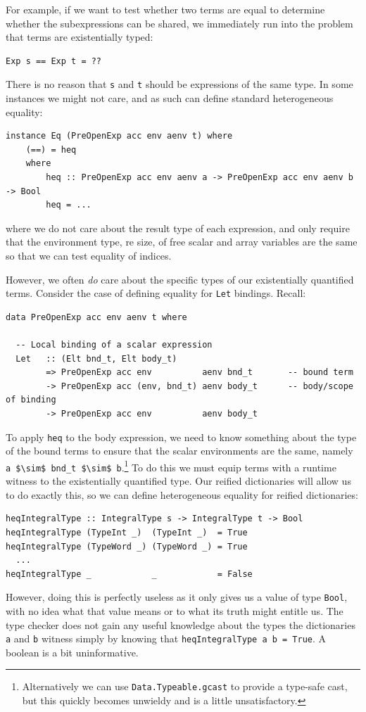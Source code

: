 For example, if we want to test whether two terms are equal to determine whether
the subexpressions can be shared, we immediately run into the problem that terms
are existentially typed:
%
\begin{lstlisting}[style=haskell]
Exp s == Exp t = ??
\end{lstlisting}
%
There is no reason that \texttt{s} and \texttt{t} should be expressions of the
same type. In some instances we might not care, and as such can define standard
heterogeneous equality:
%
\begin{lstlisting}[style=haskell]
instance Eq (PreOpenExp acc env aenv t) where
    (==) = heq
    where
        heq :: PreOpenExp acc env aenv a -> PreOpenExp acc env aenv b -> Bool
        heq = ...
\end{lstlisting}
%
where we do not care about the result type of each expression, and only require
that the environment type, re size, of free scalar and array variables are the
same so that we can test equality of  indices.

However, we often \emph{do} care about the specific types of our existentially
quantified terms. Consider the case of defining equality for \texttt{Let}
bindings. Recall:
%
\begin{lstlisting}[style=haskell]
data PreOpenExp acc env aenv t where

  -- Local binding of a scalar expression
  Let   :: (Elt bnd_t, Elt body_t)
        => PreOpenExp acc env          aenv bnd_t       -- bound term
        -> PreOpenExp acc (env, bnd_t) aenv body_t      -- body/scope of binding
        -> PreOpenExp acc env          aenv body_t
\end{lstlisting}
%
To apply \texttt{heq} to the body expression, we need to know something about
the type of the bound terms to ensure that the scalar environments are the same,
namely \lstinline[mathescape]{a $\sim$ bnd_t $\sim$ b}.\footnote{Alternatively
we can use \texttt{Data.Typeable.gcast} to provide a type-safe cast, but this
quickly becomes unwieldy and is a little unsatisfactory.} To do this we must
equip terms with a runtime witness to the existentially quantified type. Our
reified dictionaries will allow us to do exactly this, so we can define
heterogeneous equality for reified dictionaries:
%
\begin{lstlisting}[style=haskell]
heqIntegralType :: IntegralType s -> IntegralType t -> Bool
heqIntegralType (TypeInt _)  (TypeInt _)  = True
heqIntegralType (TypeWord _) (TypeWord _) = True
  ...
heqIntegralType _            _            = False
\end{lstlisting}
%
However, doing this is perfectly useless as it only gives us a value of type
\texttt{Bool}, with no idea what that value means or to what its truth might
entitle us. The type checker does not gain any useful knowledge about the types
the dictionaries \texttt{a} and \texttt{b} witness simply by knowing that
\lstinline{heqIntegralType a b = True}. A boolean is a bit uninformative.

